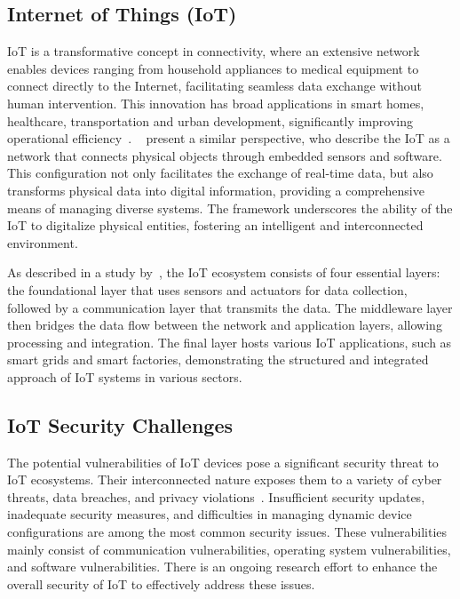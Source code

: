 \subsection{Internet of Things (IoT)}
%
IoT is a transformative concept in connectivity, where an extensive network enables devices ranging from household appliances to medical equipment to connect directly to the Internet, facilitating seamless data exchange without human intervention.
This innovation has broad applications in smart homes, healthcare, transportation and urban development, significantly improving operational efficiency~\citet{kimani2019cyber}.
~\citet{alwahedi2024machine, chui2023survey} present a similar perspective, who describe the IoT as a network that connects physical objects through embedded sensors and software.
This configuration not only facilitates the exchange of real-time data, but also transforms physical data into digital information, providing a comprehensive means of managing diverse systems.
The framework underscores the ability of the IoT to digitalize physical entities, fostering an intelligent and interconnected environment.

As described in a study by~\citet{hassija2019survey}, the IoT ecosystem consists of four essential layers: the foundational layer that uses sensors and actuators for data collection, followed by a communication layer that transmits the data.
The middleware layer then bridges the data flow between the network and application layers, allowing processing and integration.
The final layer hosts various IoT applications, such as smart grids and smart factories, demonstrating the structured and integrated approach of IoT systems in various sectors.
%
\subsection{IoT Security Challenges}
%
The potential vulnerabilities of IoT devices pose a significant security threat to IoT ecosystems.
Their interconnected nature exposes them to a variety of cyber threats, data breaches, and privacy violations~\citet{hassija2019survey}.
Insufficient security updates, inadequate security measures, and difficulties in managing dynamic device configurations are among the most common security issues. 
These vulnerabilities mainly consist of communication vulnerabilities, operating system vulnerabilities, and software vulnerabilities. 
There is an ongoing research effort to enhance the overall security of IoT to effectively address these issues.

